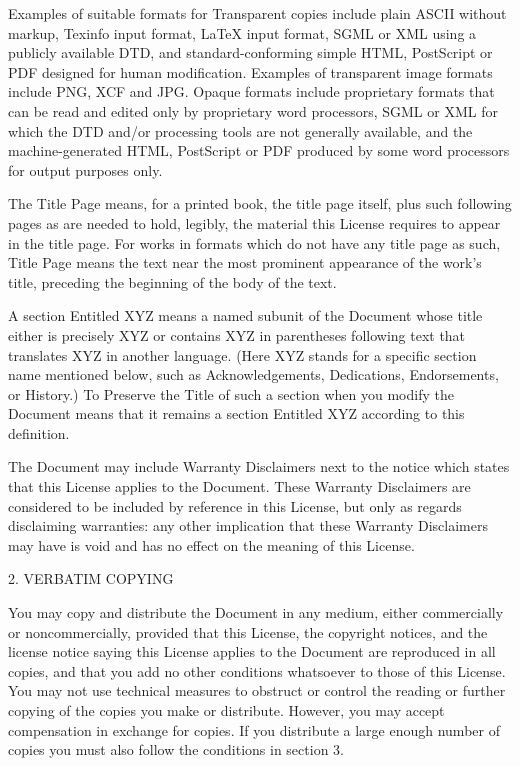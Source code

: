 Examples of suitable formats for Transparent copies include plain
ASCII without markup, Texinfo input format, LaTeX input format, SGML
or XML using a publicly available DTD, and standard-conforming simple
HTML, PostScript or PDF designed for human modification. Examples of
transparent image formats include PNG, XCF and JPG. Opaque formats
include proprietary formats that can be read and edited only by
proprietary word processors, SGML or XML for which the DTD and/or
processing tools are not generally available, and the
machine-generated HTML, PostScript or PDF produced by some word
processors for output purposes only.

The {\textquotedbl}Title Page{\textquotedbl} means, for a printed
book, the title page itself, plus such following pages as are needed
to hold, legibly, the material this License requires to appear in the
title page. For works in formats which do not have any title page as
such, {\textquotedbl}Title Page{\textquotedbl} means the text near the
most prominent appearance of the work's title, preceding the beginning
of the body of the text.

A section {\textquotedbl}Entitled XYZ{\textquotedbl} means a named
subunit of the Document whose title either is precisely XYZ or
contains XYZ in parentheses following text that translates XYZ in
another language. (Here XYZ stands for a specific section name
mentioned below, such as
{\textquotedbl}Acknowledgements{\textquotedbl},
{\textquotedbl}Dedications{\textquotedbl},
{\textquotedbl}Endorsements{\textquotedbl}, or
{\textquotedbl}History{\textquotedbl}.) To {\textquotedbl}Preserve the
Title{\textquotedbl} of such a section when you modify the Document
means that it remains a section {\textquotedbl}Entitled
XYZ{\textquotedbl} according to this definition.

The Document may include Warranty Disclaimers next to the notice which
states that this License applies to the Document.  These Warranty
Disclaimers are considered to be included by reference in this
License, but only as regards disclaiming warranties: any other
implication that these Warranty Disclaimers may have is void and has
no effect on the meaning of this License.


2. VERBATIM COPYING 

You may copy and distribute the Document in any medium, either
commercially or noncommercially, provided that this License, the
copyright notices, and the license notice saying this License applies
to the Document are reproduced in all copies, and that you add no
other conditions whatsoever to those of this License. You may not use
technical measures to obstruct or control the reading or further
copying of the copies you make or distribute. However, you may accept
compensation in exchange for copies. If you distribute a large enough
number of copies you must also follow the conditions in section 3.

